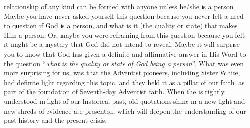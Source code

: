 relationship of any kind can be formed with anyone unless he/she is a person. Maybe you have never asked yourself this question because you never felt a need to question if God is a person, and what is it (the quality or state) that makes Him a person. Or, maybe you were refraining from this question because you felt it might be a mystery that God did not intend to reveal. Maybe it will surprise you to know that God has given a definite and affirmative answer in His Word to the question “\textit{what is the quality or state of God being a person}”. What was even more surprising for us, was that the Adventist pioneers, including Sister White, had definite light regarding this topic, and they held it as a pillar of our faith, as part of the foundation of Seventh-day Adventist faith. When the  is rightly understood in light of our historical past, old quotations shine in a new light and new shreds of evidence are presented, which will deepen the understanding of our past history and the present crisis.


